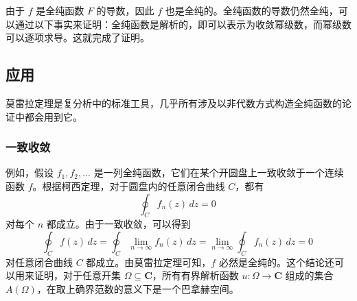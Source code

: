 由于 $f$ 是全纯函数 $F$ 的导数，因此 $f$ 也是全纯的。全纯函数的导数仍然全纯，可以通过以下事实来证明：全纯函数是解析的，即可以表示为收敛幂级数，而幂级数可以逐项求导。这就完成了证明。
\subsection{应用}
莫雷拉定理是复分析中的标准工具，几乎所有涉及以非代数方式构造全纯函数的论证中都会用到它。
\subsubsection{一致收敛}
例如，假设 $f_1, f_2, \dots$ 是一列全纯函数，它们在某个开圆盘上一致收敛于一个连续函数 $f$。根据柯西定理，对于圆盘内的任意闭合曲线 $C$，都有
$$
\oint_{C} f_n(z)\,dz = 0~
$$
对每个 $n$ 都成立。由于一致收敛，可以得到
$$
\oint_{C} f(z)\,dz
= \oint_{C} \lim_{n \to \infty} f_n(z)\,dz
= \lim_{n \to \infty} \oint_{C} f_n(z)\,dz
= 0~
$$
对任意闭合曲线 $C$ 都成立。由莫雷拉定理可知，$f$ 必然是全纯的。这个结论还可以用来证明，对于任意开集 $\Omega \subseteq \mathbf{C}$，所有有界解析函数 $u: \Omega \to \mathbf{C}$ 组成的集合 $A(\Omega)$，在取上确界范数的意义下是一个巴拿赫空间。
